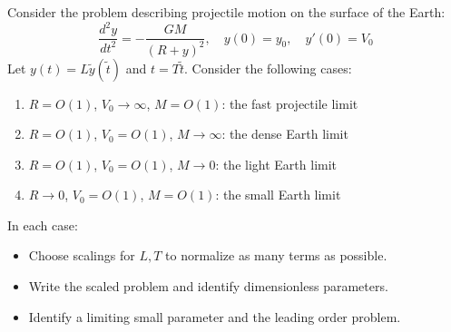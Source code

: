 \begin{exercise}
\label{applied:2017:8}
Consider the problem describing projectile motion on the surface of the Earth:
\[
\frac{d^2 y}{dt^2} = - \frac{GM}{(R + y)^2}, \quad y(0) = y_0, \quad y'(0) = V_0
\]
Let $y(t) = L\tilde{y}(\tilde{t})$ and $t = T\tilde{t}$. Consider the following cases:
\begin{enumerate}
    \item[(a)] $R = O(1)$, $V_0 \to \infty$, $M = O(1)$: the fast projectile limit
    \item[(b)] $R = O(1)$, $V_0 = O(1)$, $M \to \infty$: the dense Earth limit
    \item[(c)] $R = O(1)$, $V_0 = O(1)$, $M \to 0$: the light Earth limit
    \item[(d)] $R \to 0$, $V_0 = O(1)$, $M = O(1)$: the small Earth limit
\end{enumerate}
In each case:
\begin{itemize}
    \item Choose scalings for $L, T$ to normalize as many terms as possible.
    \item Write the scaled problem and identify dimensionless parameters.
    \item Identify a limiting small parameter and the leading order problem.
\end{itemize}
\end{exercise}

